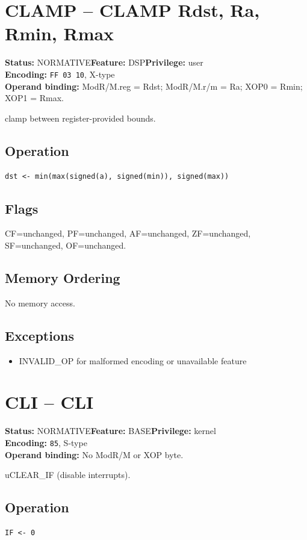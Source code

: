 \documentclass[10pt]{article}
\begin{document}
\section{CLAMP -- CLAMP Rdst, Ra, Rmin, Rmax}
\textbf{Status:} NORMATIVE\quad \textbf{Feature:} DSP\quad \textbf{Privilege:} user\\
\textbf{Encoding:} \texttt{FF 03 10}, X-type\\
\textbf{Operand binding:} ModR/M.reg = Rdst; ModR/M.r/m = Ra; XOP0 = Rmin; XOP1 = Rmax.

clamp between register-provided bounds.

\subsection*{Operation}
\begin{lstlisting}
dst <- min(max(signed(a), signed(min)), signed(max))
\end{lstlisting}
\subsection*{Flags}
CF=unchanged, PF=unchanged, AF=unchanged, ZF=unchanged, SF=unchanged, OF=unchanged.
\subsection*{Memory Ordering}
No memory access.
\subsection*{Exceptions}
\begin{itemize}
\item INVALID\_OP for malformed encoding or unavailable feature
\end{itemize}
\clearpage

\section{CLI -- CLI}
\textbf{Status:} NORMATIVE\quad \textbf{Feature:} BASE\quad \textbf{Privilege:} kernel\\
\textbf{Encoding:} \texttt{85}, S-type\\
\textbf{Operand binding:} No ModR/M or XOP byte.

uCLEAR\_IF (disable interrupts).

\subsection*{Operation}
\begin{lstlisting}
IF <- 0
\end{lstlisting}
\end{document}

